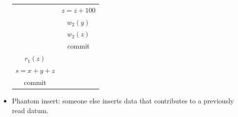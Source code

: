 \documentclass[12pt, a4paper]{report}
\newtheorem[style=M,bodystyle=\normalfont]{theorem}{Theorem}
\newtheorem[style=M,bodystyle=\normalfont]{corollary}{Corollary}
\newtheorem[style=M,bodystyle=\normalfont]{lemma}{Lemma}
\newtheorem[style=M,bodystyle=\normalfont]{definition}{Definition}
\begin{document}
\begin{itemize}
\begin{table}[H]
\begin{tabular}{c|c}
                                           & $z=z+100$                  \\
                                           & $w_2(y)$                   \\
                                           & $w_2(z)$                   \\
                                           & commit                     \\
                $r_1(z)$                   &                            \\
                $s=x+y+z$                  &                            \\
                commit                     &                           
                \end{tabular}
            \end{table}
        \item Phantom insert: someone else inserts data that contributes to a previously read datum.
    \end{itemize}
\end{document}
